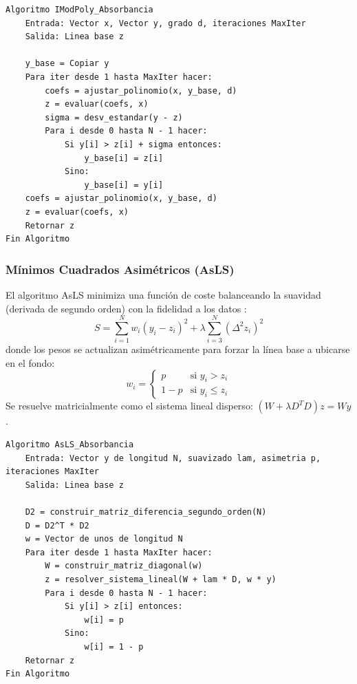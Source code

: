 \begin{lstlisting}[caption=Algoritmo IModPoly (Absorbancia)]
Algoritmo IModPoly_Absorbancia
    Entrada: Vector x, Vector y, grado d, iteraciones MaxIter
    Salida: Linea base z

    y_base = Copiar y
    Para iter desde 1 hasta MaxIter hacer:
        coefs = ajustar_polinomio(x, y_base, d)
        z = evaluar(coefs, x)
        sigma = desv_estandar(y - z)
        Para i desde 0 hasta N - 1 hacer:
            Si y[i] > z[i] + sigma entonces:
                y_base[i] = z[i]
            Sino:
                y_base[i] = y[i]
    coefs = ajustar_polinomio(x, y_base, d)
    z = evaluar(coefs, x)
    Retornar z
Fin Algoritmo
\end{lstlisting}

\subsubsection{Mínimos Cuadrados Asimétricos (AsLS)}
El algoritmo AsLS minimiza una función de coste balanceando la suavidad (derivada de segundo orden) con la fidelidad a los datos \cite{eilers2003}:
\begin{equation}
    S = \sum_{i=1}^{N} w_i (y_i - z_i)^2 + \lambda \sum_{i=3}^{N} (\Delta^2 z_i)^2
\end{equation}
donde los pesos se actualizan asimétricamente para forzar la línea base a ubicarse en el fondo:
\begin{equation}
    w_i = \begin{cases} p & \text{si } y_i > z_i \\ 1 - p & \text{si } y_i \le z_i \end{cases}
\end{equation}
Se resuelve matricialmente como el sistema lineal disperso: $(W + \lambda D^T D) z = W y$.

\begin{lstlisting}[caption=Algoritmo AsLS (Absorbancia)]
Algoritmo AsLS_Absorbancia
    Entrada: Vector y de longitud N, suavizado lam, asimetria p, iteraciones MaxIter
    Salida: Linea base z

    D2 = construir_matriz_diferencia_segundo_orden(N)
    D = D2^T * D2
    w = Vector de unos de longitud N
    Para iter desde 1 hasta MaxIter hacer:
        W = construir_matriz_diagonal(w)
        z = resolver_sistema_lineal(W + lam * D, w * y)
        Para i desde 0 hasta N - 1 hacer:
            Si y[i] > z[i] entonces:
                w[i] = p
            Sino:
                w[i] = 1 - p
    Retornar z
Fin Algoritmo
\end{lstlisting}

